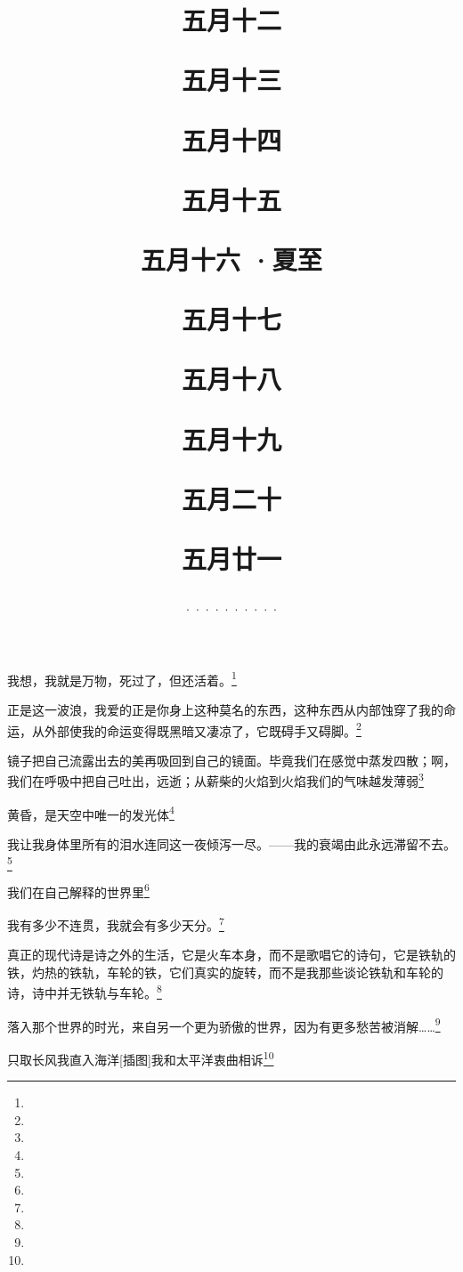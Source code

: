\title{\date[d=17,m=6,y=2024][year:cn-y,年,month:cn,day:cn,日,·,weekday]·五月十二 }
我想，我就是万物，死过了，但还活着。\footnote{ }

\title{\date[d=18,m=6,y=2024][year:cn-y,年,month:cn,day:cn,日,·,weekday]·五月十三 }
正是这一波浪，我爱的正是你身上这种莫名的东西，这种东西从内部蚀穿了我的命运，从外部使我的命运变得既黑暗又凄凉了，它既碍手又碍脚。\footnote{ }

\title{\date[d=19,m=6,y=2024][year:cn-y,年,month:cn,day:cn,日,·,weekday]·五月十四 }
镜子把自己流露出去的美再吸回到自己的镜面。毕竟我们在感觉中蒸发四散；啊，我们在呼吸中把自己吐出，远逝；从薪柴的火焰到火焰我们的气味越发薄弱\footnote{ }

\title{\date[d=20,m=6,y=2024][year:cn-y,年,month:cn,day:cn,日,·,weekday]·五月十五 }
黄昏，是天空中唯一的发光体\footnote{ }

\title{\date[d=21,m=6,y=2024][year:cn-y,年,month:cn,day:cn,日,·,weekday]·五月十六 ·夏至}
我让我身体里所有的泪水连同这一夜倾泻一尽。——我的衰竭由此永远滞留不去。\footnote{ }

\title{\date[d=22,m=6,y=2024][year:cn-y,年,month:cn,day:cn,日,·,weekday]·五月十七 }
我们在自己解释的世界里\footnote{ }

\title{\date[d=23,m=6,y=2024][year:cn-y,年,month:cn,day:cn,日,·,weekday]·五月十八 }
我有多少不连贯，我就会有多少天分。\footnote{ }

\title{\date[d=24,m=6,y=2024][year:cn-y,年,month:cn,day:cn,日,·,weekday]·五月十九 }
真正的现代诗是诗之外的生活，它是火车本身，而不是歌唱它的诗句，它是铁轨的铁，灼热的铁轨，车轮的铁，它们真实的旋转，而不是我那些谈论铁轨和车轮的诗，诗中并无铁轨与车轮。\footnote{ }

\title{\date[d=25,m=6,y=2024][year:cn-y,年,month:cn,day:cn,日,·,weekday]·五月二十 }
落入那个世界的时光，来自另一个更为骄傲的世界，因为有更多愁苦被消解……\footnote{ }

\title{\date[d=26,m=6,y=2024][year:cn-y,年,month:cn,day:cn,日,·,weekday]·五月廿一 }
只取长风我直入海洋[插图]我和太平洋衷曲相诉\footnote{ }

